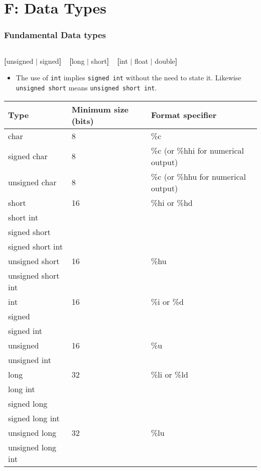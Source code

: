 \section{F: Data Types}


\begin{frame}[fragile]
\frametitle{Fundamental Data types}

\begin{columns}

\begin{column}{0.45\textwidth}
{\small
{\bf [}unsigned $|$ signed{\bf ]\ \ [}long $|$ short{\bf ]\ \ [}int $|$ float $|$ double{\bf ]}
\begin{itemize}
\item The use of {\tt int} implies {\tt signed int} without the need
to state it.  Likewise {\tt unsigned short} means {\tt unsigned short int}.
\end{itemize}
}

{\tiny
\begin{tabular}{|l|l|l|} \hline
Type & Minimum size (bits) & Format specifier \\ \hline
%
char & 8 & \%c \\ \hline
%
signed char & 8 & \%c (or \%hhi for numerical output) \\ \hline
%
unsigned char & 8 & \%c (or \%hhu for numerical output) \\ \hline
%
short & 16 & \%hi or \%hd \\
short int &  &  \\
signed short &  &  \\
signed short int &  &  \\ \hline
%
unsigned short & 16 & \%hu \\
unsigned short int &  &  \\ \hline
int & 16 & \%i or \%d \\
signed &  &  \\
signed int &  &  \\ \hline
%
unsigned & 16 & \%u \\
unsigned int &  &  \\ \hline
%
long & 32 & \%li or \%ld \\
long int &  &  \\
signed long &  &  \\
signed long int &  &  \\ \hline
%
unsigned long & 32 & \%lu \\
unsigned long int &  &  \\ \hline
\end{tabular}
}
\end{column}


\end{columns}
\end{frame}
